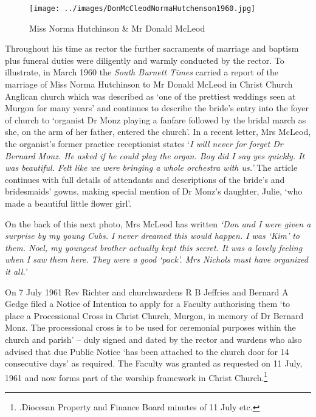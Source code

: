 \begin{figure}[!htb]
\begin{center}
\texttt{[image: ../images/DonMcCleodNormaHutchenson1960.jpg]}
\caption{Miss Norma Hutchinson \& Mr Donald McLeod}
\end{center}
\end{figure}




Throughout his time as rector the further sacraments of marriage and baptism plus funeral duties were diligently and warmly conducted by the rector. To illustrate, in March 1960 the \emph{South Burnett Times} carried a report of the marriage of Miss Norma Hutchinson to Mr Donald McLeod in Christ Church Anglican church which was described as `one of the prettiest weddings seen at Murgon for many years' and continues to describe the bride's entry into the foyer of church to `organist Dr Monz playing a fanfare followed by the bridal march as she, on the arm of her father, entered the church'. In a recent letter, Mrs McLeod, the organist's former practice receptionist states `\emph{I will never for forget Dr Bernard Monz. He asked if he could play the organ. Boy did I say yes quickly. It was beautiful. Felt like we were bringing a whole orchestra with us.'} The article continues with full details of attendants and descriptions of the bride's and bridesmaids' gowns, making special mention of Dr Monz's daughter, Julie, `who made a beautiful little flower girl'.



On the back of this next photo, Mrs McLeod has written \emph{`Don and I were given a surprise by my young Cubs. I never dreamed this would happen. I was `Kim' to them. Noel, my youngest brother actually kept this secret. It was a lovely feeling when I saw them here. They were a good `pack'. Mrs Nichols must have organized it all.'}



On 7 July 1961 Rev Richter and churchwardens R B Jeffries and Bernard A Gedge filed a Notice of Intention to apply for a Faculty authorising them `to place a Processional Cross in Christ Church, Murgon, in memory of Dr Bernard Monz. The processional cross is to be used for ceremonial purposes within the church and parish' -- duly signed and dated by the rector and wardens who also advised that due Public Notice `has been attached to the church door for 14 consecutive days' as required. The Faculty was granted as requested on 11 July, 1961 and now forms part of the worship framework in Christ Church.\footnote{.Diocesan Property and Finance Board minutes of 11 July etc.}


